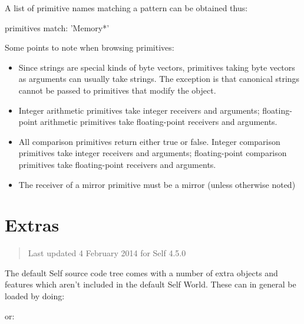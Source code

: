 \documentclass[letterpaper,10pt,english]{sphinxmanual}
\begin{document}
A list of primitive names matching a pattern can be obtained thus:

\begin{sphinxVerbatim}[commandchars=\\\{\}]
primitives match: ’\PYGZus{}Memory*’
\end{sphinxVerbatim}

Some points to note when browsing primitives:
\begin{itemize}
\item {} 
Since strings are special kinds of byte vectors, primitives taking byte vectors as arguments
can usually take strings. The exception is that canonical strings cannot be passed to primitives
that modify the object.

\item {} 
Integer arithmetic primitives take integer receivers and arguments; floating-point arithmetic
primitives take floating-point receivers and arguments.

\item {} 
All comparison primitives return either true or false. Integer comparison primitives take integer
receivers and arguments; floating-point comparison primitives take floating-point receivers
and arguments.

\item {} 
The receiver of a mirror primitive must be a mirror (unless otherwise noted)

\end{itemize}


\chapter{Extras}
\label{\detokenize{extras:extras}}\label{\detokenize{extras::doc}}\begin{quote}

Last updated 4 February 2014 for Self 4.5.0
\end{quote}

The default Self source code tree comes with a number of extra objects and features which aren't included in the default Self World. These can in general be loaded by doing:

\begin{sphinxVerbatim}[commandchars=\\\{\}]
 
\end{sphinxVerbatim}

or:
\end{document}
